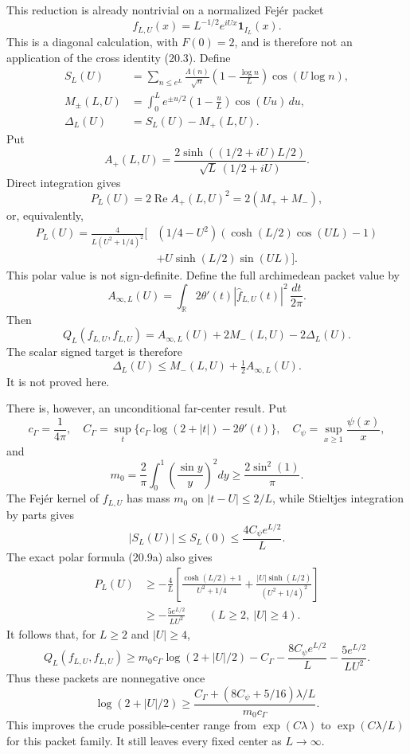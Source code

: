 \documentclass[11pt]{amsart}
\theoremstyle{definition}
\theoremstyle{remark}
\begin{document}
This reduction is already nontrivial on a normalized Fej\'er packet
\[
 f_{L,U}(x)=L^{-1/2}e^{iUx}\mathbf1_{I_L}(x).
\]
This is a diagonal calculation, with \(F(0)=2\), and is therefore not an
application of the cross identity (20.3).
Define
\[
\begin{aligned}
 S_L(U)&=\sum_{n\le e^L}\frac{\Lambda(n)}{\sqrt n}
 \left(1-\frac{\log n}{L}\right)\cos(U\log n),\\
 M_\pm(L,U)&=\int_0^Le^{\pm u/2}
 \left(1-\frac uL\right)\cos(Uu)\,du,\\
 \Delta_L(U)&=S_L(U)-M_+(L,U).
\end{aligned}
\tag{20.8}
\]
Put
\[
 A_+(L,U)=
 \frac{2\sinh((1/2+iU)L/2)}
 {\sqrt L\,(1/2+iU)}.
\]
Direct integration gives
\[
 P_L(U)
 =
 2\operatorname{Re}A_+(L,U)^2
 =2(M_++M_-),
\tag{20.9}
\]
or, equivalently,
\[
\begin{aligned}
 P_L(U)
 =\frac{4}{L(U^2+1/4)^2}\Big[
 &(1/4-U^2)(\cosh(L/2)\cos(UL)-1)\\
 &+U\sinh(L/2)\sin(UL)
 \Big].
\end{aligned}
\tag{20.9a}
\]
This polar value is not sign-definite.  Define the full archimedean packet
value by
\[
 A_{\infty,L}(U)
 =
 \int_{\mathbb R}2\theta'(t)
 |\widehat f_{L,U}(t)|^2\,\frac{dt}{2\pi}.
\tag{20.9b}
\]
Then
\[
\boxed{
 Q_L(f_{L,U},f_{L,U})
 =
 A_{\infty,L}(U)+2M_-(L,U)-2\Delta_L(U).}
\tag{20.10}
\]
The scalar signed target is therefore
\[
 \Delta_L(U)
 \le M_-(L,U)+\tfrac12A_{\infty,L}(U).
\tag{20.11}
\]
It is not proved here.

There is, however, an unconditional far-center result.  Put
\[
 c_\Gamma=\frac1{4\pi},
 \quad
 C_\Gamma=
 \sup_t\{c_\Gamma\log(2+|t|)-2\theta'(t)\},
 \quad
 C_\psi=\sup_{x\ge1}\frac{\psi(x)}x,
\]
and
\[
 m_0=\frac2\pi\int_0^1\left(\frac{\sin y}{y}\right)^2dy
 \ge\frac{2\sin^2(1)}{\pi}.
\]
The Fej\'er kernel of \(f_{L,U}\) has mass \(m_0\) on
\(|t-U|\le2/L\), while Stieltjes integration by parts gives
\[
 |S_L(U)|\le S_L(0)\le\frac{4C_\psi e^{L/2}}L.
\]
The exact polar formula (20.9a) also gives
\[
\begin{aligned}
 P_L(U)
 &\ge-\frac4L\left[
 \frac{\cosh(L/2)+1}{U^2+1/4}
 +\frac{|U|\sinh(L/2)}{(U^2+1/4)^2}
 \right]\\
 &\ge-\frac{5e^{L/2}}{LU^2}
 \qquad(L\ge2,\ |U|\ge4).
\end{aligned}
\]
It follows that, for \(L\ge2\) and \(|U|\ge4\),
\[
\boxed{
 Q_L(f_{L,U},f_{L,U})
 \ge
 m_0c_\Gamma\log(2+|U|/2)-C_\Gamma
 -\frac{8C_\psi e^{L/2}}L
 -\frac{5e^{L/2}}{LU^2}.}
\tag{20.12}
\]
Thus these packets are nonnegative once
\[
 \log(2+|U|/2)
 \ge
 \frac{C_\Gamma+(8C_\psi+5/16)\lambda/L}{m_0c_\Gamma}.
\tag{20.13}
\]
This improves the crude possible-center range from
\(\exp(C\lambda)\) to \(\exp(C\lambda/L)\) for this packet family.
It still leaves every fixed center as \(L\to\infty\).
\end{document}
